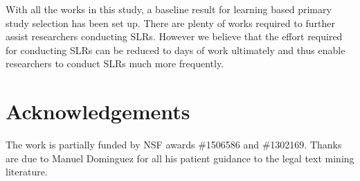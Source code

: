 \documentclass[final,twocolumn,5p]{elsarticle}
\theoremstyle{break}
\begin{document}
With all the works in this study, a baseline result for learning based primary study selection has been set up. There are plenty of works required to further assist researchers conducting SLRs. However we believe that the effort required for conducting SLRs can be reduced to days of work ultimately and thus enable researchers to conduct SLRs much more frequently.

	\section*{Acknowledgements}
		The work is partially funded by NSF  awards \#1506586 and \#1302169. Thanks are due to Manuel Dominguez for all his
		patient guidance to the legal text mining literature.

 
\vspace*{0.5mm}
 
 
% 

%  





\end{document}
